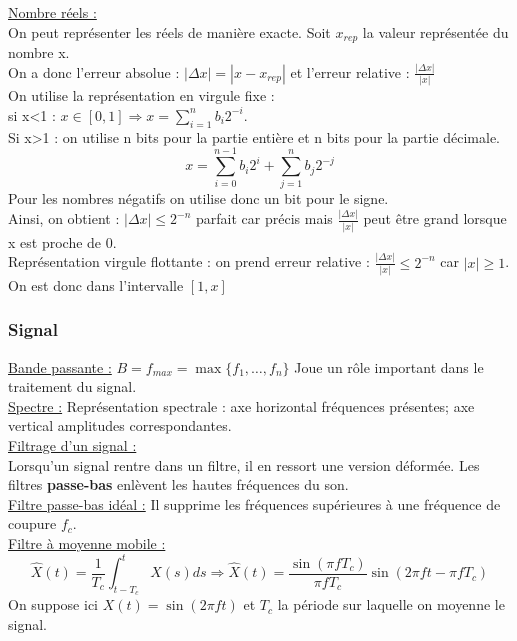 \documentclass[../main.tex]{subfiles}
\begin{document}
\quad \underline{Nombre réels :}\\
On peut représenter les réels de manière exacte. Soit $x_{rep}$ la valeur représentée du nombre x.\\
On a donc l'erreur absolue : $|\Delta x| = |x-x_{rep}|$ et l'erreur relative : $\frac{|\Delta x|}{|x|}$\\
On utilise la représentation en virgule fixe :\\
si x<1 : $x\in [0,1] \Rightarrow x = \sum_{i=1}^n b_i 2^{-i}$.\\
Si x>1 : on utilise n bits pour la partie entière et n bits pour la partie décimale.\\
\begin{equation}
    x = \sum_{i=0}^{n-1} b_i 2^i + \sum_{j=1}^n b_j 2^{-j}
\end{equation}
Pour les nombres négatifs on utilise donc un bit pour le signe.\\
Ainsi, on obtient : $|\Delta x| \leq 2^{-n}$ parfait car précis mais $\frac{|\Delta x|}{|x|}$ peut être grand lorsque x est proche de 0.\\

Représentation virgule flottante : on prend erreur relative : $\frac{|\Delta x|}{|x|} \leq 2^{-n}$ car $|x| \geq 1$. On est donc dans l'intervalle $[1,x]$\\

\subsubsection{Signal}
\quad \underline{Bande passante :}
$B = f_{max} = \max\{f_1, \dots, f_n\}$
Joue un rôle important dans le traitement du signal.\\

\quad \underline{Spectre :} Représentation spectrale : axe horizontal fréquences présentes; axe vertical amplitudes correspondantes.\\

\quad \underline{Filtrage d'un signal :}\\
Lorsqu'un signal rentre dans un filtre, il en ressort une version déformée. Les filtres \textbf{passe-bas} enlèvent les hautes fréquences du son. \\

\quad \underline{Filtre passe-bas idéal :} Il supprime les fréquences supérieures à une fréquence de coupure $f_c$.\\

\quad \underline{Filtre à moyenne mobile :}\\
\begin{equation}
    \hat{X}(t) = \frac{1}{T_c} \int_{t-T_c}^t X(s) ds \Rightarrow \hat{X}(t) = \frac{\sin{(\pi fT_c)}}{\pi fT_c} \sin{(2\pi ft-\pi fT_c)}
\end{equation}
On suppose ici $X(t) = \sin{(2\pi ft)}$ et $T_c$ la période sur laquelle on moyenne le signal.\\
\end{document}
